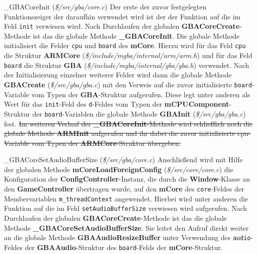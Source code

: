 \documentclass[11pt,a4paper]{scrartcl}
\begin{document}
\vspace{5mm}
\large {\_}GBACoreInit \normalsize(\textit{\$/src/gba/core.c})
\vspace{2mm}\newline
Der erste der zuvor festgelegten Funktionszeiger der daraufhin verwendet wird ist der der Funktion auf die im Feld \verb|init| verwiesen wird. Nach Durchlaufen der globalen \textbf{GBACoreCreate}-Methode ist das die globale Methode \textbf{{\_}GBACoreInit}. Die globale Methode initialisiert die Felder \verb|cpu| und \verb|board| des \textbf{mCore}. Hierzu wird f\"ur das Feld \verb|cpu| die Struktur \textbf{ARMCore} (\textit{\$/include/mgba/internal/arm/arm.h}) und f\"ur das Feld \verb|board| die Struktur \textbf{GBA} (\textit{\$/include/mgba/internal/gba/gba.h}) verwendet. Nach der Initialisierung einzelner weiterer Felder wird dann die globale Methode \textbf{GBACreate} (\textit{\$/src/gba/gba.c}) mit den Verweis auf die zuvor initialisierte \verb|board|-Variable vom Typen der \textbf{GBA}-Struktur aufgerufen. Diese legt unter anderen als Wert f\"ur das \verb|init|-Feld des \verb|d|-Feldes vom Typen der \textbf{mCPUComponent}-Struktur der \verb|board|-Variablen die globale Methode \textbf{GBAInit} (\textit{\$/src/gba/gba.c}) fest. \sout{Im weiteren Verlauf der \textbf{{\_}GBACoreInit}-Methode wird schlie{\ss}lich noch die globale Methode \textbf{ARMInit} aufgerufen und ihr dabei die zuvor initialisierte cpu-Variable vom Typen der \textbf{ARMCore}-Struktur \"ubergeben.}

\vspace{5mm}
\large {\_}GBACoreSetAudioBufferSize \normalsize(\textit{\$/src/gba/core.c})
\vspace{2mm}\newline
Anschlie{\ss}end wird mit Hilfe der globalen Methode \textbf{mCoreLoadForeignConfig} (\textit{\$/src/core/core.c}) die Konfiguration der \textbf{ConfigController}-Instanz, die durch die \textbf{Window}-Klasse an den \textbf{GameController} \"ubertragen wurde, auf den \textbf{mCore} des \verb|core|-Feldes der Membervariablen \verb|m_threadContext| angewendet. Hierbei wird unter anderen die Funktion auf die im Feld \verb|setAudioBufferSize| verwiesen wird aufgerufen. Nach Durchlaufen der globalen \textbf{GBACoreCreate}-Methode ist das die globale Methode \textbf{{\_}GBACoreSetAudioBufferSize}. Sie leitet den Aufruf direkt weiter an die globale Methode \textbf{GBAAudioResizeBuffer} unter Verwendung des \verb|audio|-Feldes der \textbf{GBAAudio}-Struktur des \verb|board|-Felds der \textbf{mCore}-Struktur.
\end{document}
